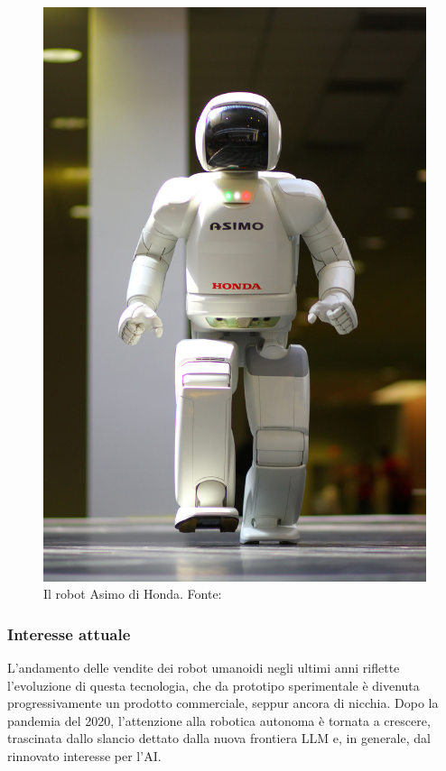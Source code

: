 \begin{figure}[h]
    \centering
    \includegraphics[width=0.35\linewidth]{immagini/ASIMO.jpg}
    \caption{Il robot Asimo di Honda. Fonte: \cite{wikipediaAsimo}}
    \label{fig:ASIMO}
\end{figure}

\subsubsection{Interesse attuale}
L'andamento delle vendite dei robot umanoidi negli ultimi anni riflette l'evoluzione di questa tecnologia, che da prototipo sperimentale è divenuta progressivamente un prodotto commerciale, seppur ancora di nicchia. Dopo la pandemia del 2020, l'attenzione alla robotica autonoma è tornata a crescere, trascinata dallo slancio dettato dalla nuova frontiera LLM e, in generale, dal rinnovato interesse per l'AI. 

